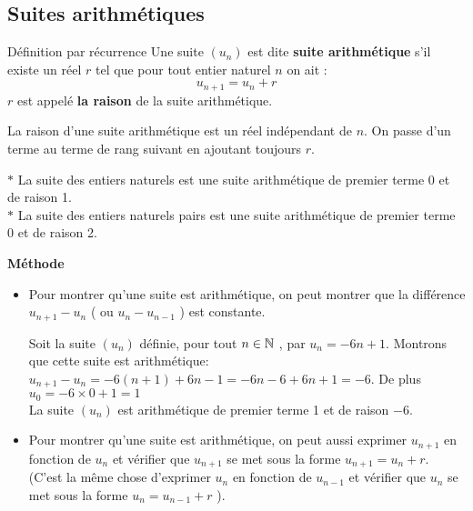 \subsection{Suites arithmétiques}
\begin{definition}{Définition par récurrence}
Une suite $(u_{n})$ est dite   \textbf{suite arithmétique} s'il existe un réel $ r $ tel que   pour tout entier naturel $n$ on ait :  \[  u_{n+1}=u_{n}+r \]
$r$ est appelé  \textbf{la raison} de la suite arithmétique.
\end{definition}
\begin{remark}
La raison d'une suite arithmétique est un réel indépendant de $ n. $ On passe d'un terme au terme de rang suivant en ajoutant toujours $ r$.
\end{remark} 
\begin{example}
$ \ast $ La suite des entiers naturels est une suite arithmétique  de premier terme 0 et de raison 1. \\
$ \ast $ La suite des entiers naturels  pairs est une suite arithmétique de premier terme 0 et de raison 2.

\end{example}
\textbf {Méthode}
\begin{itemize}
\item [\textbullet] Pour montrer qu'une suite est arithmétique, on peut montrer que la différence $ u_{n+1}-u_{n} $   ( ou $ u_{n}-u_{n-1} $ ) est constante.
\begin{example} Soit la suite $(u_{n})$ définie, pour tout $ n\in\mathbb{N} $ , par $ u_{n}=-6n+1 $. Montrons que cette suite est arithmétique: \\
 $ u_{n+1}-u_{n}= -6(n+1)+6n-1=-6n-6+6n+1=-6 $.  De plus $ u_{0}= -6\times0+1=1 $\\
 La suite $(u_{n})$ est arithmétique de premier terme 1 et de raison $ -6 $.
 \end{example}
 \item [\textbullet] Pour montrer qu'une suite est arithmétique, on peut aussi  exprimer $ u_{n+1} $ en fonction de  $ u_{n}$ et vérifier que  $ u_{n+1} $ se met sous la forme   $ u_{n+1}=u_{n}+r $. \\
 (C'est la même chose d'exprimer $ u_{n} $ en fonction de  $ u_{n-1}$ et vérifier que  $ u_{n} $ se met sous la forme   $ u_{n}=u_{n-1}+r $ ). 
 \end{itemize}
